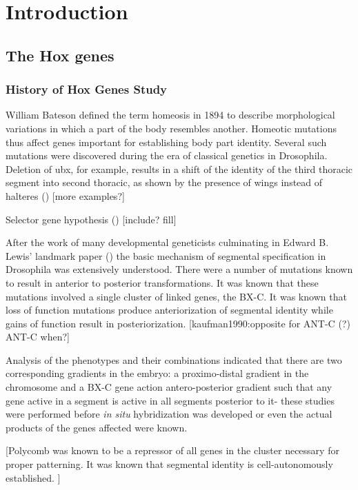 \chapter{Introduction}


\label{chp:intro}

\section{The Hox genes}

\subsection{History of Hox Genes Study}

William Bateson defined the term homeosis in 1894 to describe morphological variations in which a part of the body resembles another. Homeotic mutations thus affect genes important for establishing body part identity. Several such mutations were discovered during the era of classical genetics in Drosophila. Deletion of \ac{ubx}, for example, results in a shift of the identity of the third thoracic segment into second thoracic, as shown by the presence of wings instead of halteres (\cite{ref}) [more examples?]

Selector gene hypothesis (\cite{Garcia-Bellido1975,Garcia-Bellido1977}) [include? fill]

After the work of many developmental geneticists culminating in Edward B. Lewis' landmark paper (\cite{Lewis1978}) the basic mechanism of segmental specification in Drosophila was extensively understood. There were a number of mutations known to result in anterior to posterior transformations. It was known that these mutations involved a single cluster of linked genes, the \ac{BX-C}. It was known that loss of function mutations produce anteriorization of segmental identity while gains of function result in posteriorization. [kaufman1990:opposite for \ac{ANT-C} (?) \ac{ANT-C} when?]

Analysis of the phenotypes and their combinations indicated that there are two corresponding gradients in the embryo: a proximo-distal gradient in the chromosome and a \ac{BX-C} gene action antero-posterior gradient such that any gene active in a segment is active in all segments posterior to it- these studies were performed before \textit{in situ} hybridization was developed or even the actual products of the genes affected were known.

[Polycomb was known to be a repressor of all genes in the cluster necessary for proper patterning. It was known that segmental identity is cell-autonomously established. ]

